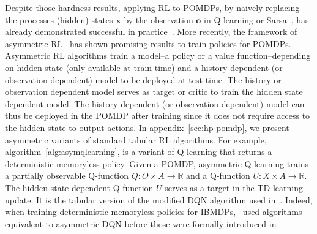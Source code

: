 Despite those hardness results, applying RL to POMDPs, by naively replacing the processes (hidden) states $\boldsymbol{x}$ by the observation $\boldsymbol{o}$ in Q-learning or Sarsa~\citep{sutton}, has already demonstrated successful in practice~\citep{sarsa-pomdp}.
More recently, the framework of asymmetric RL~\citep{pinto,baisero-dqn,baisero-ppo} has shown promising results to train policies for POMDPs.
Asymmetric RL algorithms train a model--a policy or a value function--depending on hidden state (only available at train time) and a history dependent (or observation dependent) model to be deployed at test time.
The history or observation dependent model serves as target or critic to train the hidden state dependent model.
The history dependent (or observation dependent) model can thus be deployed in the POMDP after training since it does not require access to the hidden state to output actions.
In appendix~\ref{sec:hp-pomdp}, we present asymmetric variants of standard tabular RL algorithms.
For example, algorithm~\ref{alg:asymqlearning}, is a variant of Q-learning that returns a deterministic memoryless policy.
Given a POMDP, asymmetric Q-learning trains a partially observable Q-function $Q:O\times A\rightarrow\mathbb{R}$ and a Q-function $U:X\times A\rightarrow\mathbb{R}$.
The hidden-state-dependent Q-function $U$ serves as a target in the TD learning update.
It is the tabular version of the modified DQN algorithm used in~\cite{topin2021iterative}.
Indeed, when training deterministic memoryless policies for IBMDPs,~\cite{topin2021iterative} used algorithms equivalent to asymmetric DQN before those were formally introduced in~\citet{baisero-dqn,baisero-ppo}.


